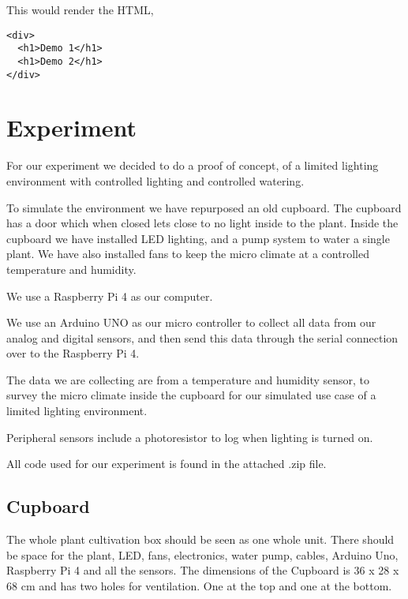 \documentclass[a4paper,12pt,twoside,openright,titlepage]{book}
\begin{document}
\bigskip

This would render the HTML,

\begin{verbatim}
<div>
  <h1>Demo 1</h1>
  <h1>Demo 2</h1>
</div>
\end{verbatim}



\chapter{Experiment}
For our experiment we decided to do a proof of concept, of a limited lighting environment with controlled lighting and controlled watering.

To simulate the environment we have repurposed an old cupboard. The cupboard has a door which when closed lets close to no light inside to the plant.
Inside the cupboard we have installed LED lighting, and a pump system to water a single plant.
We have also installed fans to keep the micro climate at a controlled temperature and humidity.

We use a Raspberry Pi 4 as our computer.

We use an Arduino UNO as our micro controller to collect all data from our analog and digital sensors, and then send this data through the serial connection over to the Raspberry Pi 4.

The data we are collecting are from a temperature and humidity sensor, to survey the micro climate inside the cupboard for our simulated use case of a limited lighting environment.

Peripheral sensors include a photoresistor to log when lighting is turned on.

All code used for our experiment is found in the attached .zip file.

\section{Cupboard}

The whole plant cultivation box should be seen as one whole unit. There should be space for the plant, LED, fans, electronics, water pump, cables, Arduino Uno, Raspberry Pi 4 and all the sensors.
The dimensions of the Cupboard is 36 x 28 x 68 cm and has two holes for ventilation. One at the top and one at the bottom.
\end{document}
